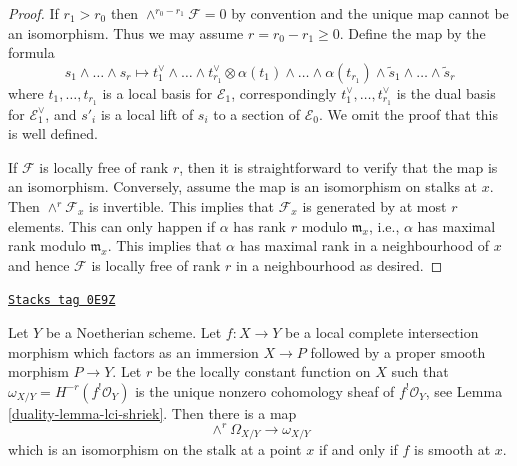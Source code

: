 \begin{proof}
If $r_1 > r_0$ then $\wedge^{r_0 - r_1}\mathcal{F} = 0$ by convention
and the unique map cannot be an isomorphism. Thus we may assume
$r = r_0 - r_1 \geq 0$. Define the map by the formula
$$
s_1 \wedge \ldots \wedge s_r \mapsto
t_1^\vee \wedge \ldots \wedge t_{r_1}^\vee \otimes
\alpha(t_1) \wedge \ldots \wedge \alpha(t_{r_1}) \wedge
\tilde s_1 \wedge \ldots \wedge \tilde s_r
$$
where $t_1, \ldots, t_{r_1}$ is a local basis for $\mathcal{E}_1$,
correspondingly
$t_1^\vee, \ldots, t_{r_1}^\vee$ is the dual basis for $\mathcal{E}_1^\vee$,
and $s'_i$ is a local lift of $s_i$ to a section of $\mathcal{E}_0$.
We omit the proof that this is well defined.

\medskip\noindent
If $\mathcal{F}$ is locally free of rank $r$, then it is straightforward
to verify that the map is an isomorphism. Conversely, assume the map
is an isomorphism on stalks at $x$. Then $\wedge^r\mathcal{F}_x$
is invertible. This implies that $\mathcal{F}_x$ is generated by
at most $r$ elements. This can only happen if $\alpha$ has rank
$r$ modulo $\mathfrak m_x$, i.e., $\alpha$ has maximal rank modulo
$\mathfrak m_x$. This implies that $\alpha$ has maximal rank
in a neighbourhood of $x$ and hence $\mathcal{F}$ is locally free
of rank $r$ in a neighbourhood as desired.
\end{proof}

\begin{lemma}
\label{duality-lemma-fundamental-class-lci}
\href{https://stacks.math.columbia.edu/tag/0E9Z}{\texttt{Stacks tag 0E9Z}}

Let $Y$ be a Noetherian scheme. Let $f : X \to Y$ be a
local complete intersection morphism which factors
as an immersion $X \to P$ followed by a proper smooth morphism $P \to Y$.
Let $r$ be the locally constant function on
$X$ such that $\omega_{X/Y} = H^{-r}(f^!\mathcal{O}_Y)$
is the unique nonzero cohomology sheaf of $f^!\mathcal{O}_Y$, see
Lemma \ref{duality-lemma-lci-shriek}.
Then there is a map
$$
\wedge^r\Omega_{X/Y} \longrightarrow \omega_{X/Y}
$$
which is an isomorphism on the stalk at a point $x$ if and only
if $f$ is smooth at $x$.
\end{lemma}

